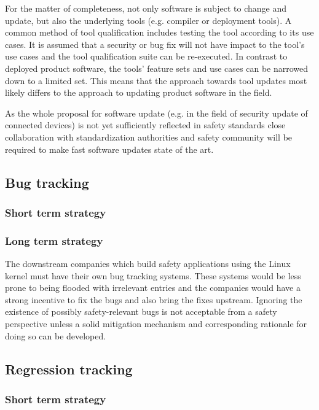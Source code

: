 \documentclass[12pt]{../Common_files/ElisaPaper}
\begin{document}
For the matter of completeness, not only software is subject to change and update, but also the underlying tools (e.g. compiler or deployment tools). 
A common method of tool qualification includes testing the tool according to its use cases. 
It is assumed that a security or bug fix will not have impact to the tool's use cases and 
the tool qualification suite can be re-executed. 
In contrast to deployed product software, 
the tools' feature sets and use cases can be narrowed down to a limited set. 
This means that the approach towards tool updates most likely differs to the approach to updating product software in the field.

As the whole proposal for software update (e.g. in the field of security update of connected devices) 
is not yet sufficiently reflected in safety standards 
close collaboration with standardization authorities and safety community 
will be required to make fast software updates state of the art.
\subsection{Bug tracking}

\subsubsection{Short term strategy}

\subsubsection{Long term strategy}
The downstream companies which build safety applications using the Linux kernel must have their own bug tracking systems.
These systems would be less prone to being flooded with irrelevant entries and 
the companies would have a strong incentive to fix the bugs and also bring the fixes upstream. 
Ignoring the existence of possibly safety-relevant bugs is not acceptable from a safety perspective 
unless a solid mitigation mechanism and corresponding rationale for doing so can be developed.

\subsection{Regression tracking}
\subsubsection{Short term strategy}
\end{document}
